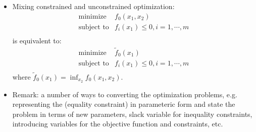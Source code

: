 \documentclass{report}
\begin{document}
\begin{itemize}
\item Mixing constrained and unconstrained optimization: 
\begin{equation}
\begin{array}{ll}
\text{minimize} & f_0(x_1,x_2) \\
\text{subject to} & f_i(x_1) \leq 0, i = 1, \cdots, m\\
\end{array}
\end{equation}
is equivalent to: 
\begin{equation}
\begin{array}{ll}
\text{minimize} & \tilde{f}_0(x_1) \\
\text{subject to} & f_i(x_1) \leq 0, i = 1, \cdots, m\\
\end{array}
\end{equation}
where $\tilde{f}_0(x_1) = \inf_{x_2} f_0(x_1,x_2)$. 

\item Remark: a number of ways to converting the optimization problems, e.g. representing the (equality constraint) in parameteric form and state the problem in terms of new parameters, slack variable for inequality constraints, introducing variables for the objective function and constraints, etc. 

\end{itemize}
\end{document}
